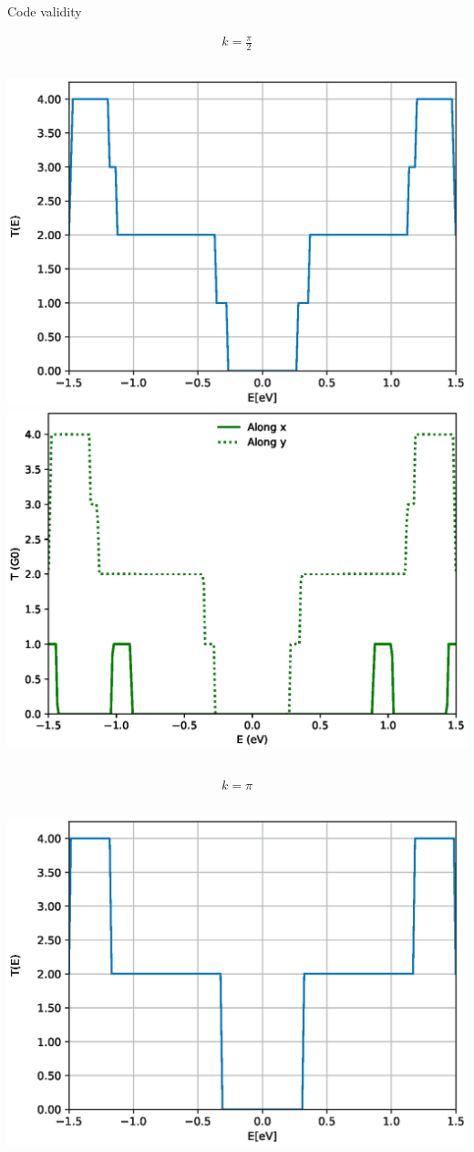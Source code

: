 \documentclass[hyperref={colorlinks=true,urlcolor=blue,linkcolor=.},aspectratio=1610,mathserif]{beamer}
\begin{document}
\begin{frame}{Code validity}
\centering
\begin{overprint}
\centering
\begin{align*}
		k = \frac{\pi}{2}
\end{align*}
\begin{columns}[t]
    \includegraphics[width=.9\textwidth]{Figures/NPGNormal_pi-half.eps}
    \includegraphics[width=.87\textwidth]{Figures/txy_pi-half.eps}
\end{columns}
\centering
\begin{align*}
		k = \pi
\end{align*}
\begin{columns}[t]
    \includegraphics[width=.9\textwidth]{Figures/NPGNormal_pi.eps}

\end{columns}
\end{overprint}
\end{frame}
\end{document}
